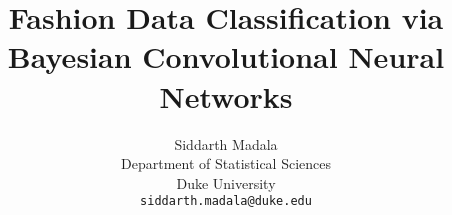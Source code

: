 \documentclass{article} %
\title{Fashion Data Classification via Bayesian Convolutional Neural Networks}
\author{
Siddarth Madala \\
Department of Statistical Sciences \\
Duke University \\
\texttt{siddarth.madala@duke.edu}
}
\begin{document}
\maketitle














{

}
\end{document}

